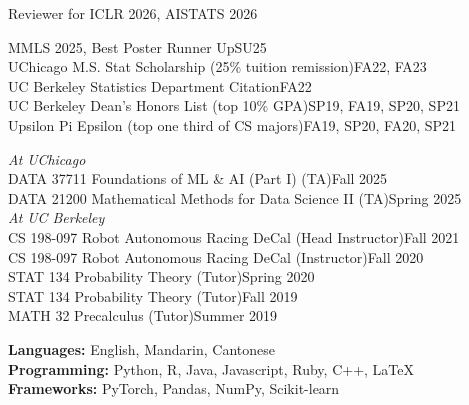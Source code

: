 \documentclass[10pt,letterpaper]{article}
\newlength{\labw}\setlength{\labw}{1.15in}
\newenvironment{sect}[1]{%
  \begin{list}{}{\setlength{\leftmargin}{\labw}\setlength{\labelwidth}{\labw}%
  \setlength{\labelsep}{0pt}\setlength{\itemsep}{0pt}\setlength{\topsep}{0pt}\setlength{\parsep}{0pt}}%
  \item[{\raisebox{0pt}[0pt][0pt]{\parbox[t]{\labw}{\bfseries\raggedright\MakeUppercase{#1}}}}]}%
  {\end{list}\vspace{1.1em}}
\begin{document}
\begin{sect}{Academic\\Service}
Reviewer for ICLR 2026, AISTATS 2026
\end{sect}

\begin{sect}{Awards}
MMLS 2025, Best Poster Runner Up\hfill SU25\\
UChicago M.S. Stat Scholarship (25\% tuition remission)\hfill FA22, FA23\\
UC Berkeley Statistics Department Citation\hfill FA22\\
UC Berkeley Dean's Honors List (top 10\% GPA)\hfill SP19, FA19, SP20, SP21\\
Upsilon Pi Epsilon (top one third of CS majors)\hfill FA19, SP20, FA20, SP21
\end{sect}

\begin{sect}{Teaching}
\textit{At UChicago}\\[2pt]
DATA 37711 Foundations of ML \& AI (Part I) (TA)\hfill Fall 2025\\
DATA 21200 Mathematical Methods for Data Science II (TA)\hfill Spring 2025\\[4pt]
\textit{At UC Berkeley}\\[2pt]
CS 198-097 Robot Autonomous Racing DeCal (Head Instructor)\hfill Fall 2021\\
CS 198-097 Robot Autonomous Racing DeCal (Instructor)\hfill Fall 2020\\
STAT 134 Probability Theory (Tutor)\hfill Spring 2020\\
STAT 134 Probability Theory (Tutor)\hfill Fall 2019\\
MATH 32 Precalculus (Tutor)\hfill Summer 2019
\end{sect}

\begin{sect}{Skills}
\textbf{Languages:} English, Mandarin, Cantonese\\
\textbf{Programming:} Python, R, Java, Javascript, Ruby, C++, \LaTeX\\
\textbf{Frameworks:} PyTorch, Pandas, NumPy, Scikit-learn
\end{sect}
\end{document}
